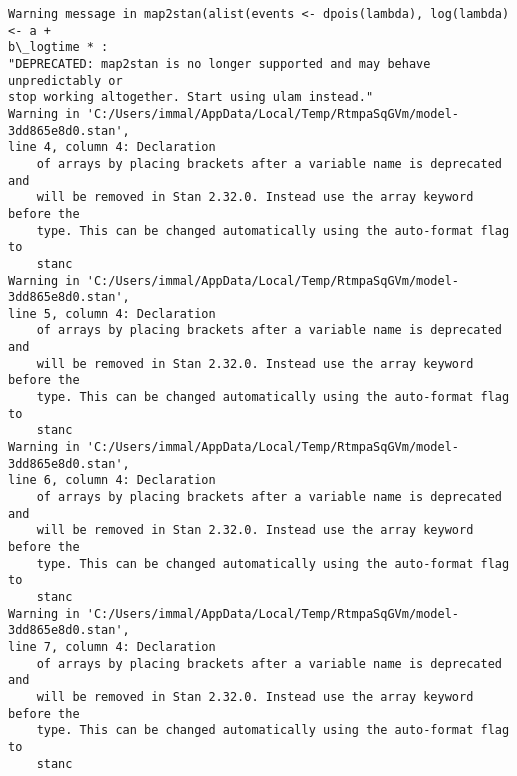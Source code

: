\documentclass[11pt]{article}
\begin{document}
    \begin{Verbatim}[commandchars=\\\{\}]
Warning message in map2stan(alist(events <- dpois(lambda), log(lambda) <- a +
b\_logtime * :
"DEPRECATED: map2stan is no longer supported and may behave unpredictably or
stop working altogether. Start using ulam instead."
Warning in 'C:/Users/immal/AppData/Local/Temp/RtmpaSqGVm/model-3dd865e8d0.stan',
line 4, column 4: Declaration
    of arrays by placing brackets after a variable name is deprecated and
    will be removed in Stan 2.32.0. Instead use the array keyword before the
    type. This can be changed automatically using the auto-format flag to
    stanc
Warning in 'C:/Users/immal/AppData/Local/Temp/RtmpaSqGVm/model-3dd865e8d0.stan',
line 5, column 4: Declaration
    of arrays by placing brackets after a variable name is deprecated and
    will be removed in Stan 2.32.0. Instead use the array keyword before the
    type. This can be changed automatically using the auto-format flag to
    stanc
Warning in 'C:/Users/immal/AppData/Local/Temp/RtmpaSqGVm/model-3dd865e8d0.stan',
line 6, column 4: Declaration
    of arrays by placing brackets after a variable name is deprecated and
    will be removed in Stan 2.32.0. Instead use the array keyword before the
    type. This can be changed automatically using the auto-format flag to
    stanc
Warning in 'C:/Users/immal/AppData/Local/Temp/RtmpaSqGVm/model-3dd865e8d0.stan',
line 7, column 4: Declaration
    of arrays by placing brackets after a variable name is deprecated and
    will be removed in Stan 2.32.0. Instead use the array keyword before the
    type. This can be changed automatically using the auto-format flag to
    stanc


    \end{Verbatim}
\end{document}
